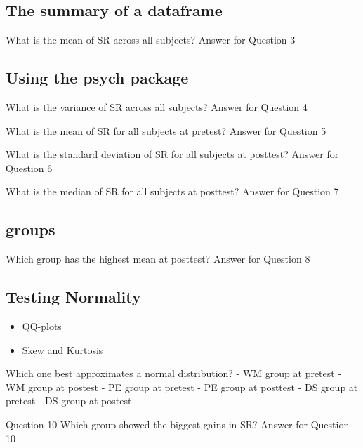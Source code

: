 \documentclass[11pt]{article} %
\begin{document}
\subsection{The summary of a dataframe}
What is the mean of SR across all subjects?
Answer for Question 3

\subsection{Using the psych package}
What is the variance of SR across all subjects?
Answer for Question 4

What is the mean of SR for all subjects at pretest?
Answer for Question 5

What is the standard deviation of SR for all subjects at posttest?
Answer for Question 6

What is the median of SR for all subjects at posttest?
Answer for Question 7

\subsection{groups}
Which group has the highest mean at posttest?
Answer for Question 8

\subsection{Testing Normality}

\begin{itemize}
\item QQ-plots
\item Skew and Kurtosis
\end{itemize}

Which one best approximates a normal distribution?
- WM group at pretest
- WM group at postest
- PE group at pretest
- PE group at posttest
- DS group at pretest
- DS group at postest

Question 10
Which group showed the biggest gains in SR?
Answer for Question 10
\end{document}
